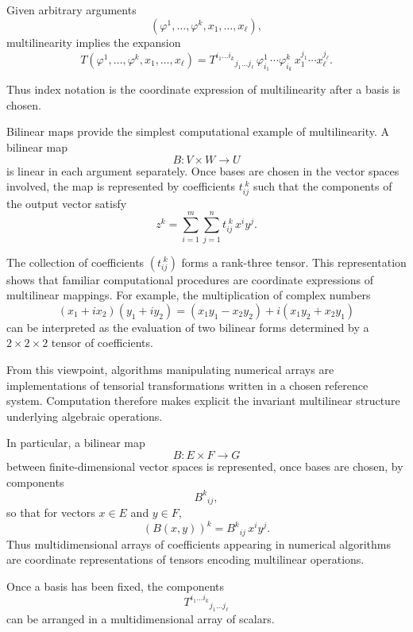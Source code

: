 \medskip

Given arbitrary arguments
\[
(\varphi^1, \dots, \varphi^k, x_1, \dots, x_\ell),
\]
multilinearity implies the expansion
\[
T(\varphi^1, \dots, \varphi^k, x_1, \dots, x_\ell)
=
T^{i_1 \dots i_k}{}_{j_1 \dots j_\ell}
\,
\varphi^1_{i_1} \cdots \varphi^k_{i_k}
\,
x_1^{j_1} \cdots x_\ell^{j_\ell}.
\]

Thus index notation is the coordinate expression of multilinearity after a
basis is chosen.

\medskip

Bilinear maps provide the simplest computational example of multilinearity.
A bilinear map
\[
B : V \times W \to U
\]
is linear in each argument separately. Once bases are chosen in the vector
spaces involved, the map is represented by coefficients $t_{ij}^{\;k}$ such
that the components of the output vector satisfy
\begin{equation}
z^{k} = \sum_{i=1}^{m}\sum_{j=1}^{n} t_{ij}^{\;k}\, x^{i} y^{j}.
\end{equation}

The collection of coefficients $(t_{ij}^{\;k})$ forms a rank-three tensor.
This representation shows that familiar computational procedures are coordinate
expressions of multilinear mappings. For example, the multiplication of complex
numbers
\begin{equation}
(x_1 + i x_2)(y_1 + i y_2)
= (x_1 y_1 - x_2 y_2)
+ i(x_1 y_2 + x_2 y_1)
\end{equation}
can be interpreted as the evaluation of two bilinear forms determined by a
$2 \times 2 \times 2$ tensor of coefficients.

From this viewpoint, algorithms manipulating numerical arrays are
implementations of tensorial transformations written in a chosen reference
system. Computation therefore makes explicit the invariant multilinear
structure underlying algebraic operations.

\medskip

In particular, a bilinear map
\[
B : E \times F \to G
\]
between finite-dimensional vector spaces is represented, once bases are chosen,
by components
\[
B^k{}_{ij},
\]
so that for vectors $x \in E$ and $y \in F$,
\[
(B(x,y))^k = B^k{}_{ij}\, x^i y^j.
\]
Thus multidimensional arrays of coefficients appearing in numerical algorithms
are coordinate representations of tensors encoding multilinear operations.

\medskip

Once a basis has been fixed, the components
\[
T^{i_1 \dots i_k}{}_{j_1 \dots j_\ell}
\]
can be arranged in a multidimensional array of scalars.

